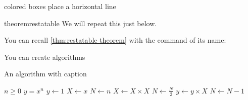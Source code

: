 colored boxes
place a horizontal line \horz
{}
\begin{restatable}{theorem}{restatable}\label{thm:restatable theorem}
    We will repeat this just below. 
\end{restatable}
You can recall \cref{thm:restatable theorem} with the command of its name:
\restatable*

\par You can create algorithms 
\begin{algorithm}
    \caption{An algorithm with caption}\label{alg:cap}
    \begin{algorithmic}
    \Require $n \geq 0$
    \Ensure $y = x^n$
    \State $y \gets 1$
    \State $X \gets x$
    \State $N \gets n$
        \State $X \gets X \times X$
        \State $N \gets \frac{N}{2}$  
        \State $y \gets y \times X$
        \State $N \gets N - 1$
    \EndIf
    \EndWhile
    \end{algorithmic}
    \end{algorithm}

